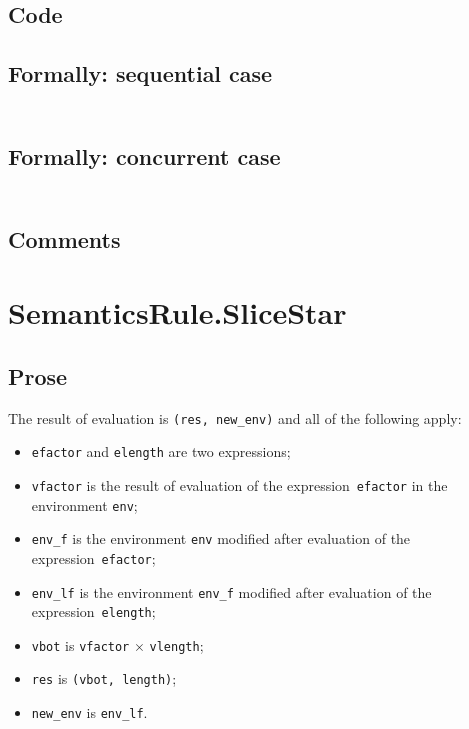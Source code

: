 \documentclass{book}
\begin{document}
  \subsection{Code}

  \subsection{Formally: sequential case}
  \begin{align}
  \end{align} 

  \subsection{Formally: concurrent case}
  \begin{align}
  \end{align} 

  \subsection{Comments}

\section{SemanticsRule.SliceStar \label{sec:SemanticsRule.SliceStar}}

  \subsection{Prose}
  The result of evaluation is \texttt{(res, new\_env)} and all of the following
apply:
  \begin{itemize}
  \item \texttt{efactor} and \texttt{elength} are two expressions;
  \item \texttt{vfactor} is the result of evaluation of the expression~\texttt{efactor} in the environment \texttt{env}; 
  \item \texttt{env\_f} is the environment \texttt{env} modified after evaluation of the expression~\texttt{efactor}; 
  \item \texttt{env\_lf} is the environment \texttt{env\_f} modified after evaluation of the expression~\texttt{elength};
  \item \texttt{vbot} is \texttt{vfactor} $\times$ \texttt{vlength};
  \item \texttt{res} is \texttt{(vbot, length)};
  \item \texttt{new\_env} is \texttt{env\_lf}.
  \end{itemize}
\end{document}
